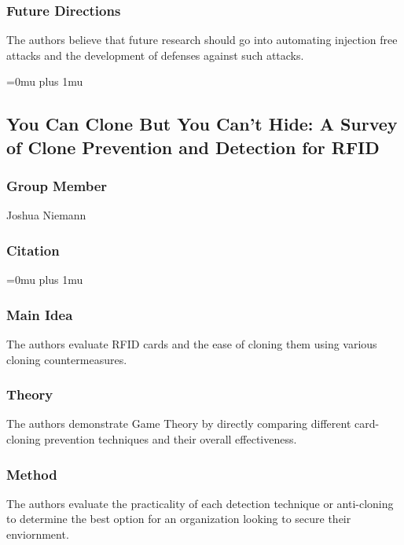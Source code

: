 \subsubsection{Future Directions}

\noindent
The authors believe that future research should go into automating injection free attacks and the development of defenses against such attacks. 

\Urlmuskip=0mu plus 1mu\relax

\noindent
\subsection{{Y}ou {C}an {C}lone {B}ut {Y}ou {C}an't {H}ide: {A} {S}urvey of {C}lone {P}revention and {D}etection for {RFID}}

\subsubsection{Group Member}

\noindent
Joshua Niemann

\noindent
\subsubsection{Citation}

\Urlmuskip=0mu plus 1mu\relax

\subsubsection{Main Idea}

\noindent
 The authors evaluate RFID cards and the ease of cloning them using various cloning countermeasures.

\subsubsection{Theory}

\noindent
 The authors demonstrate Game Theory by directly comparing different card-cloning prevention techniques and their overall effectiveness.

\subsubsection{Method}

\noindent
 The authors evaluate the practicality of each detection technique or anti-cloning to determine the best option for an organization looking to secure their enviornment.

